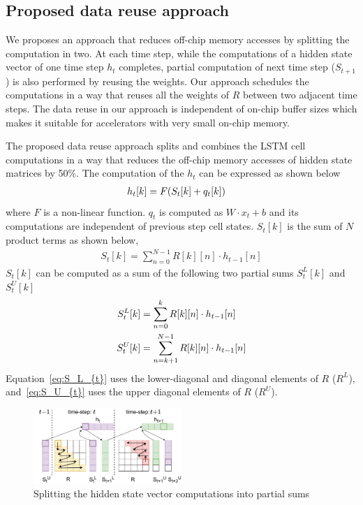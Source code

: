 \documentclass[a4paper,10pt]{article}
\begin{document}
\subsection{Proposed data reuse approach}
We proposes an approach that reduces off-chip memory accesses by splitting the computation in two. At each time step, while the computations of a hidden state vector of one time step $h_t$ completes, partial computation of next time step ($S_{t+1}$) is also performed by reusing the weights.
Our approach schedules the computations in a way that reuses all the weights of $R$ between two adjacent time steps. The data reuse in our approach is independent of on-chip buffer sizes which makes it suitable for accelerators with very small on-chip memory.

The proposed data reuse approach splits and combines the LSTM cell computations in a way that reduces the off-chip memory accesses of hidden state matrices by 50\%. The computation of the $h_t$ can be expressed as shown below
\begin{align}\label{eq:h_{t}}
	h_{t}[k] &= F( S_{t}[k]+q_{t}[k])
\end{align}
where $F$ is a non-linear function. $q_{t}$ is computed as $W{\cdot}x_t{+}b$ and its computations are independent of previous step cell states. $S_{t}[k]$ is the sum of $N$ product terms as shown below,
\begin{align}
	S_{t}[k] = \sum_{n=0}^{N-1}R[k][n]\cdot h_{t-1}[n]
\end{align}
$S_{t}[k]$ can be computed as a sum of the following two partial sums $S_{t}^{L}[k]$ and $S_{t}^{U}[k]$
\begin{align}      
	S_{t}^{L}[k] &= \sum_{n=0}^{k}R[k][n]\cdot h_{t-1}[n] \label{eq:S_L_{t}}\\
	S_{t}^{U}[k] &= \sum_{n=k+1}^{N-1}R[k][n]\cdot h_{t-1}[n] \label{eq:S_U_{t}}
\end{align}
Equation~\eqref{eq:S_L_{t}} uses the lower-diagonal and diagonal elements of $R$ ($R^L$), and~\eqref{eq:S_U_{t}} uses the upper diagonal elements of $R$ ($R^U$). 
\begin{figure}[!htb]
	\centerline{\includegraphics[width=0.5\textwidth]{TwoTimeSteps.pdf}}
	\caption{Splitting the hidden state vector computations into partial sums}
	\label{fig:TwoTimeStepsComputation}
	\vspace{-1.0em}	
\end{figure}
\end{document}
